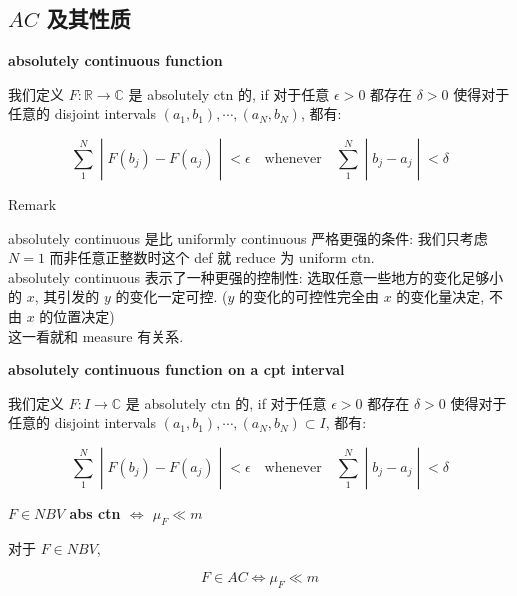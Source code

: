 \documentclass{qlnotes-export}
\begin{document}
\subsection{\texorpdfstring{\(AC\) 及其性质}{AC 及其性质}}\label{ac-ux53caux5176ux6027ux8d28}

\begin{definition}{\protect{}\label{kn-absolutely-continuous-function}{\textbf{absolutely
continuous function}}}

我们定义 \(F:{\mathbb{R}}\rightarrow{\mathbb{C}}\) 是 absolutely ctn 的, if 对于任意 \(\epsilon > 0\) 都存在 \(\delta > 0\) 使得对于任意的 disjoint intervals \((a_{1},b_{1}),\cdots,(a_{N},b_{N})\), 都有:

\[\left. \sum\limits_{1}^{N} \middle| F(b_{j}) - F(a_{j}) \middle| < \epsilon\quad\text{whenever}\quad\sum\limits_{1}^{N} \middle| b_{j} - a_{j} \middle| < \delta \right.\]

\end{definition}

\begin{qlremark}{Remark}

absolutely continuous 是比 uniformly continuous 严格更强的条件: 我们只考虑 \(N = 1\) 而非任意正整数时这个 def 就 reduce 为 uniform ctn.\\
absolutely continuous 表示了一种更强的控制性: 选取任意一些地方的变化足够小的 \(x\), 其引发的 \(y\) 的变化一定可控. (\(y\) 的变化的可控性完全由 \(x\) 的变化量决定, 不由 \(x\) 的位置决定)\\
这一看就和 measure 有关系.

\end{qlremark}

\begin{definition}{\protect{}\label{kn-absolutely-continuous-function-on-a-cpt-interval}{\textbf{absolutely
continuous function on a cpt interval}}}

我们定义 \(F:I\rightarrow{\mathbb{C}}\) 是 absolutely ctn 的, if 对于任意 \(\epsilon > 0\) 都存在 \(\delta > 0\) 使得对于任意的 disjoint intervals \((a_{1},b_{1}),\cdots,(a_{N},b_{N}) \subset I\), 都有:

\[\left. \sum\limits_{1}^{N} \middle| F(b_{j}) - F(a_{j}) \middle| < \epsilon\quad\text{whenever}\quad\sum\limits_{1}^{N} \middle| b_{j} - a_{j} \middle| < \delta \right.\]

\end{definition}

\begin{lemma}{\protect{}\label{kn-f-in-nbv-abs-ctn-iff-mu-f-ll-m}{\textbf{\(F \in NBV\)
abs ctn \(\Leftrightarrow\) \(\mu_{F} \ll m\)}}}

对于 \(F \in NBV\),

\[F \in AC\Leftrightarrow\mu_{F} \ll m\]

\end{lemma}
\end{document}
